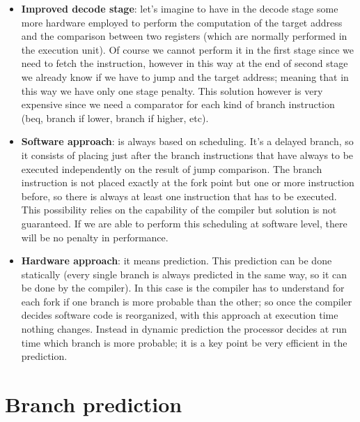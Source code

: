 \begin{itemize}
  \item \textbf{Improved decode stage}: let's imagine to have in the decode
    stage some more hardware employed to perform the computation of the target
    address and the comparison between two registers (which are normally
    performed in the execution unit). Of course we cannot perform it in the
    first stage since we need to fetch the instruction, however in this way at
    the end of second stage we already know if we have to jump and the target
    address; meaning that in this way we have only one stage penalty. This
    solution however is very expensive since we need a comparator for each kind
    of branch instruction (beq, branch if lower, branch if higher, etc).

  \item \textbf{Software approach}: is always based on scheduling. It's a
    delayed branch, so it consists of placing just after the branch instructions
    that have always to be executed independently on the result of jump
    comparison. The branch instruction is not placed exactly at the fork point
    but one or more instruction before, so there is always at least one
    instruction that has to be executed. This possibility relies on the
    capability of the compiler but solution is not guaranteed. If we are able to
    perform this scheduling at software level, there will be no penalty in
    performance.

  \item \textbf{Hardware approach}: it means prediction. This prediction can be
    done statically (every single branch is always predicted in the same way, so
    it can be done by the compiler). In this case is the compiler has to
    understand for each fork if one branch is more probable than the other; so
    once the compiler decides software code is reorganized, with this approach
    at execution time nothing changes. Instead in dynamic prediction the
    processor decides at run time which branch is more probable; it is a key
    point be very efficient in the prediction.
\end{itemize}


\section{Branch prediction}


